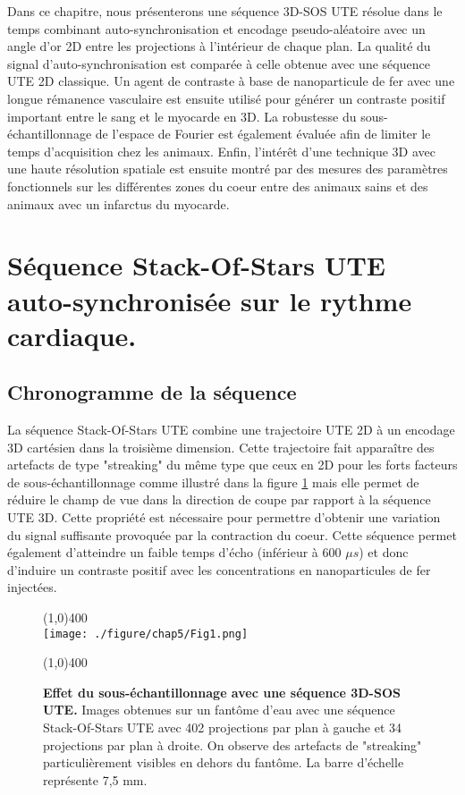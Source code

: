 Dans ce chapitre, nous présenterons une séquence 3D-SOS UTE résolue dans le temps combinant auto-synchronisation et encodage pseudo-aléatoire avec un angle d'or 2D entre les projections à l'intérieur de chaque plan. La qualité du signal d’auto-synchronisation est comparée à celle obtenue avec une séquence UTE 2D classique. Un agent de contraste à base de nanoparticule de fer avec une longue rémanence vasculaire est ensuite utilisé pour générer un contraste positif important entre le sang et le myocarde en 3D. La robustesse du sous-échantillonnage de l’espace de Fourier est également évaluée afin de limiter le temps d’acquisition chez les animaux. Enfin, l’intérêt d'une technique 3D avec une haute résolution spatiale est ensuite montré  par des mesures des paramètres fonctionnels sur les différentes zones du coeur entre des animaux sains et des animaux avec un infarctus du myocarde.

\section{Séquence Stack-Of-Stars UTE auto-synchronisée sur le rythme cardiaque.}

\subsection{Chronogramme de la séquence}

La séquence Stack-Of-Stars UTE combine une trajectoire UTE 2D à un encodage 3D cartésien dans la troisième dimension. Cette trajectoire fait apparaître des artefacts de type "streaking" du même type que ceux en 2D pour les forts facteurs de sous-échantillonnage comme illustré dans la figure \ref{fig:SoSUTE} mais elle permet de réduire le champ de vue dans la direction de coupe par rapport à la séquence UTE 3D. Cette propriété est nécessaire pour permettre d'obtenir une variation du signal suffisante provoquée par la contraction du coeur. Cette séquence permet également d'atteindre un faible temps d'écho (inférieur à 600 $\mu s$) et donc d'induire un contraste positif avec les concentrations en nanoparticules de fer injectées.

\begin{figure}[H]
\centering
\line(1,0){400} \\
\texttt{[image: ./figure/chap5/Fig1.png]}
\caption[Effet du sous-échantillonnage avec une séquence 3D-SOS UTE.]{\label{fig:SoSUTE} \textbf{Effet du sous-échantillonnage avec une séquence 3D-SOS UTE.} Images obtenues sur un fantôme d'eau avec une séquence Stack-Of-Stars UTE avec 402 projections par plan à gauche et 34 projections par plan à droite. On observe des artefacts de "streaking" particulièrement visibles en dehors du fantôme. La barre d'échelle représente 7,5 mm.}
\line(1,0){400} \\ 
\end{figure}

